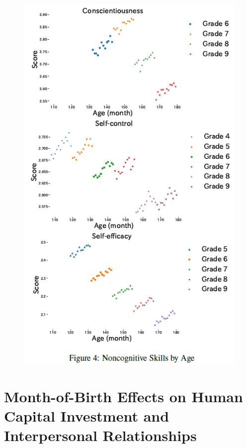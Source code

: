 \documentclass[../root]{subfiles}
\begin{document}
\begin{figure}[ht]
      \includegraphics[scale = 1]{0904tanji/F4}
    \end{figure}

    \section{Month-of-Birth Effects on Human Capital Investment and Interpersonal Relationships}
\end{document}
